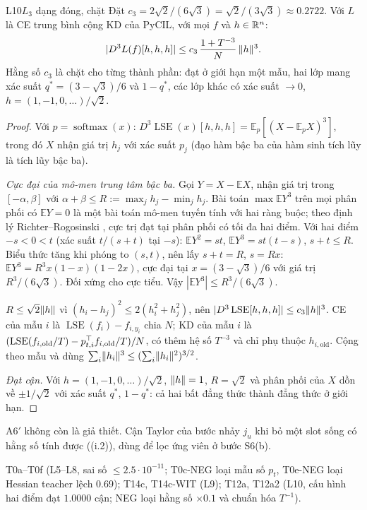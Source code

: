 \begin{namedthm}{L10}{$L_3$ dạng đóng, chặt}
Đặt $c_3=2\sqrt2/(6\sqrt3)=\sqrt2/(3\sqrt3)\approx0.2722$. Với $L$ là CE trung bình cộng KD của PyCIL, với mọi $f$ và $h\in\mathbb{R}^n$:
\[
|D^3L(f)[h,h,h]|\le c_3\,\frac{1+T^{-3}}{N}\,\lVert h\rVert^3 .
\]
Hằng số $c_3$ là chặt cho từng thành phần: đạt ở giới hạn một mẫu, hai lớp mang xác suất $q^*=(3-\sqrt3)/6$ và $1-q^*$, các lớp khác có xác suất $\to0$, $h=(1,-1,0,\dots)/\sqrt2$.
\end{namedthm}
\begin{proof}
Với $p=\operatorname{softmax}(x)$: $D^3\operatorname{LSE}(x)[h,h,h]=\mathbb E_p[(X-\mathbb E_pX)^3]$, trong đó $X$ nhận giá trị $h_j$ với xác suất $p_j$ (đạo hàm bậc ba của hàm sinh tích lũy là tích lũy bậc ba).

\emph{Cực đại của mô-men trung tâm bậc ba.} Gọi $Y=X-\mathbb EX$, nhận giá trị trong $[-\alpha,\beta]$ với $\alpha+\beta\le R:=\max_jh_j-\min_jh_j$. Bài toán $\max\mathbb EY^3$ trên mọi phân phối có $\mathbb EY=0$ là một bài toán mô-men tuyến tính với hai ràng buộc; theo định lý Richter--Rogosinski \cite{richter1957,rogosinski1958}, cực trị đạt tại phân phối có tối đa hai điểm. Với hai điểm $-s<0<t$ (xác suất $t/(s+t)$ tại $-s$): $\mathbb EY^2=st$, $\mathbb EY^3=st(t-s)$, $s+t\le R$. Biểu thức tăng khi phóng to $(s,t)$, nên lấy $s+t=R$, $s=Rx$: $\mathbb EY^3=R^3x(1-x)(1-2x)$, cực đại tại $x=(3-\sqrt3)/6$ với giá trị $R^3/(6\sqrt3)$. Đối xứng cho cực tiểu. Vậy $|\mathbb EY^3|\le R^3/(6\sqrt3)$.

$R\le\sqrt2\lVert h\rVert$ vì $(h_i-h_j)^2\le2(h_i^2+h_j^2)$, nên $|D^3\operatorname{LSE}[h,h,h]|\le c_3\lVert h\rVert^3$. CE của mẫu $i$ là $\operatorname{LSE}(f_i)-f_{i,y_i}$ chia $N$; KD của mẫu $i$ là $(\operatorname{LSE}(f_{i,\mathrm{old}}/T)-p_{t,i}^{\top} f_{i,\mathrm{old}}/T)/N$, có thêm hệ số $T^{-3}$ và chỉ phụ thuộc $h_{i,\mathrm{old}}$. Cộng theo mẫu và dùng $\sum_i\lVert h_i\rVert^3\le(\sum_i\lVert h_i\rVert^2)^{3/2}$.

\emph{Đạt cận.} Với $h=(1,-1,0,\dots)/\sqrt2$, $\lVert h\rVert=1$, $R=\sqrt2$ và phân phối của $X$ dồn về $\pm1/\sqrt2$ với xác suất $q^*$, $1-q^*$: cả hai bất đẳng thức thành đẳng thức ở giới hạn.
\end{proof}
\begin{hequa}
A6$'$ không còn là giả thiết. Cận Taylor của bước nhảy $j_u$ khi bỏ một slot sống có hằng số tính được ((i.2)), dùng để lọc ứng viên ở bước S6(b).
\end{hequa}
\begin{kiem}
T0a--T0f (L5--L8, sai số $\le2.5\cdot10^{-11}$; T0c-NEG loại mẫu số $p_t$, T0e-NEG loại Hessian teacher lệch 0.69); T14c, T14c-WIT (L9); T12a, T12a2 (L10, cấu hình hai điểm đạt $1.0000$ cận; NEG loại hằng số ${\times}0.1$ và chuẩn hóa $T^{-1}$).
\end{kiem}
